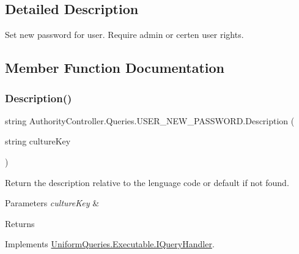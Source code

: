 \subsection{Detailed Description}
Set new password for user. Require admin or certen user rights. 



\subsection{Member Function Documentation}
\mbox{\label{class_authority_controller_1_1_queries_1_1_u_s_e_r___n_e_w___p_a_s_s_w_o_r_d_a04d2af1732d4ac353076d489fe75c696}} 
\subsubsection{\texorpdfstring{Description()}{Description()}}
{\footnotesize\ttfamily string Authority\+Controller.\+Queries.\+U\+S\+E\+R\+\_\+\+N\+E\+W\+\_\+\+P\+A\+S\+S\+W\+O\+R\+D.\+Description (\begin{DoxyParamCaption}\item[{string}]{culture\+Key }\end{DoxyParamCaption})}



Return the description relative to the lenguage code or default if not found. 


\begin{DoxyParams}{Parameters}
{\em culture\+Key} & \\
\hline
\end{DoxyParams}
\begin{DoxyReturn}{Returns}

\end{DoxyReturn}


Implements \mbox{\hyperlink{interface_uniform_queries_1_1_executable_1_1_i_query_handler_ae0e55919571d5456af31298394d241a9}{Uniform\+Queries.\+Executable.\+I\+Query\+Handler}}.

